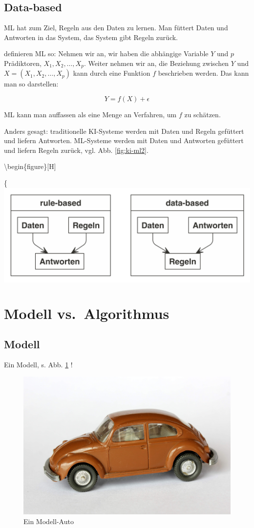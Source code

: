 \documentclass[
]{book}
\begin{document}
\hypertarget{data-based}{%
\subsection{Data-based}\label{data-based}}

ML hat zum Ziel, Regeln aus den Daten zu lernen. Man füttert Daten und Antworten in das System, das System gibt Regeln zurück.

\citet{james_introduction_2021} definieren ML so:
Nehmen wir an, wir haben die abhängige Variable \(Y\) und \(p\) Prädiktoren, \(X_1,X_2, \ldots, X_p\).
Weiter nehmen wir an, die Beziehung zwischen \(Y\) und \(X = (X_1, X_2, \ldots, X_p)\) kann durch eine Funktion \(f\) beschrieben werden.
Das kann man so darstellen:

\[Y = f(X) + \epsilon\]

ML kann man auffassen als eine Menge an Verfahren, um \(f\) zu schätzen.

Anders gesagt: traditionelle KI-Systeme werden mit Daten und Regeln gefüttert und liefern Antworten.
ML-Systeme werden mit Daten und Antworten gefüttert und liefern Regeln zurück, vgl. Abb. \ref{fig:ki-ml2}.

\textbackslash begin\{figure\}{[}H{]}

\{\centering \includegraphics[width=0.5\linewidth]{chunk-img/ki-ml2-1}

\hypertarget{modell-vs.-algorithmus}{%
\section{Modell vs.~Algorithmus}\label{modell-vs.-algorithmus}}

\hypertarget{modell}{%
\subsection{Modell}\label{modell}}

Ein Modell, s. Abb. \ref{fig:vw} \citep{spurzem_vw_2017}!

\begin{figure}[H]

{\centering \includegraphics[width=0.33\linewidth]{img/vw_modell} 

}

\caption{Ein Modell-Auto}\label{fig:vw}
\end{figure}
\end{document}
